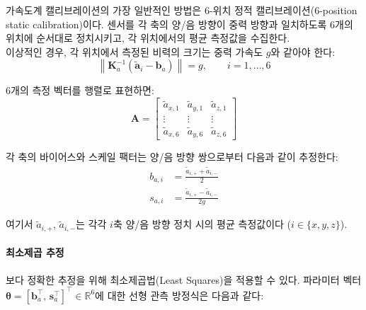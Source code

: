                 가속도계 캘리브레이션의 가장 일반적인 방법은 6-위치 정적 캘리브레이션(6-position static calibration)이다. 센서를 각 축의 양/음 방향이 중력 방향과 일치하도록 6개의 위치에 순서대로 정치시키고, 각 위치에서의 평균 측정값을 수집한다.\\

                이상적인 경우, 각 위치에서 측정된 비력의 크기는 중력 가속도 $g$와 같아야 한다:\\

                \begin{equation}
                    \left\| \mathbf{K}_a^{-1}(\tilde{\mathbf{a}}_i - \mathbf{b}_a) \right\| = g, \qquad i = 1, \ldots, 6
                    \label{eq:accel_6pos_constraint}
                \end{equation}

                6개의 측정 벡터를 행렬로 표현하면:\\

                \begin{equation}
                    \mathbf{A} = \begin{bmatrix}
                        \tilde{a}_{x,1} & \tilde{a}_{y,1} & \tilde{a}_{z,1} \\
                        \vdots & \vdots & \vdots \\
                        \tilde{a}_{x,6} & \tilde{a}_{y,6} & \tilde{a}_{z,6}
                    \end{bmatrix}
                    \label{eq:accel_meas_matrix}
                \end{equation}

                각 축의 바이어스와 스케일 팩터는 양/음 방향 쌍으로부터 다음과 같이 추정한다:\\

                \begin{align}
                    b_{a,i}   &= \frac{\tilde{a}_{i,+} + \tilde{a}_{i,-}}{2} \label{eq:accel_bias_est} \\
                    s_{a,i}   &= \frac{\tilde{a}_{i,+} - \tilde{a}_{i,-}}{2g} \label{eq:accel_scale_est}
                \end{align}

                \noindent 여기서 $\tilde{a}_{i,+}$, $\tilde{a}_{i,-}$는 각각 $i$축 양/음 방향 정치 시의 평균 측정값이다 ($i \in \{x, y, z\}$).\\

            \paragraph{최소제곱 추정}
                보다 정확한 추정을 위해 최소제곱법(Least Squares)을 적용할 수 있다. 파라미터 벡터 $\boldsymbol{\theta} = [\mathbf{b}_a^\top,\, \mathbf{s}_a^\top]^\top \in \mathbb{R}^6$에 대한 선형 관측 방정식은 다음과 같다:\\

